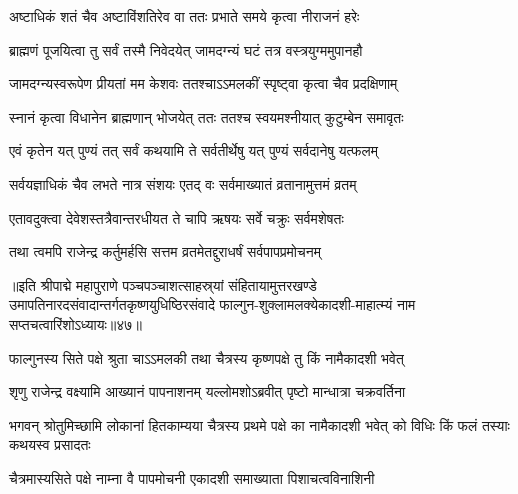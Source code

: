 \twolineshloka
{अष्टाधिकं शतं चैव अष्टाविंशतिरेव वा}
{ततः प्रभाते समये कृत्वा नीराजनं हरेः}%

\twolineshloka
{ब्राह्मणं पूजयित्वा तु सर्वं तस्मै निवेदयेत्}
{जामदग्न्यं घटं तत्र वस्त्रयुग्ममुपानहौ}%

\twolineshloka
{जामदग्न्यस्वरूपेण प्रीयतां मम केशवः}
{ततश्चाऽऽमलकीं स्पृष्ट्वा कृत्वा चैव प्रदक्षिणाम्}%

\twolineshloka
{स्नानं कृत्वा विधानेन ब्राह्मणान् भोजयेत् ततः}
{ततश्च स्वयमश्नीयात् कुटुम्बेन समावृतः}%

\twolineshloka
{एवं कृतेन यत् पुण्यं तत् सर्वं कथयामि ते}
{सर्वतीर्थेषु यत् पुण्यं सर्वदानेषु यत्फलम्}%

\twolineshloka
{सर्वयज्ञाधिकं चैव लभते नात्र संशयः}
{एतद् वः सर्वमाख्यातं व्रतानामुत्तमं व्रतम्}%

\twolineshloka
{एतावदुक्त्वा देवेशस्तत्रैवान्तरधीयत}
{ते चापि ऋषयः सर्वे चक्रुः सर्वमशेषतः}%

\twolineshloka
{तथा त्वमपि राजेन्द्र कर्तुमर्हसि सत्तम}
{व्रतमेतद्दुराधर्षं सर्वपापप्रमोचनम्}%

॥इति श्रीपाद्मे महापुराणे पञ्चपञ्चाशत्साहस्र्यां संहितायामुत्तरखण्डे उमापतिनारदसंवादान्तर्गतकृष्णयुधिष्ठिरसंवादे फाल्गुन-शुक्लामलक्येकादशी-माहात्म्यं नाम सप्तचत्वारिंशोऽध्यायः॥४७॥

\genMangalaShloka

\hyperref[sec:ekadashi_mahatmyam_padma_puranam]{\closesub}
\clearpage

\label{sec:padma-chaitra-krishna-papamochani}

\ganapatyadiDhyanam
\padmaPuranam



\twolineshloka
{फाल्गुनस्य सिते पक्षे श्रुता चाऽऽमलकी तथा}
{चैत्रस्य कृष्णपक्षे तु किं नामैकादशी भवेत्}%


\twolineshloka
{शृणु राजेन्द्र वक्ष्यामि आख्यानं पापनाशनम्}
{यल्लोमशोऽब्रवीत् पृष्टो मान्धात्रा चक्रवर्तिना}%


\threelineshloka
{भगवन् श्रोतुमिच्छामि लोकानां हितकाम्यया}
{चैत्रस्य प्रथमे पक्षे का नामैकादशी भवेत्}
{को विधिः किं फलं तस्याः कथयस्व प्रसादतः}%


\twolineshloka
{चैत्रमास्यसिते पक्षे नाम्ना वै पापमोचनी}
{एकादशी समाख्याता पिशाचत्वविनाशिनी}%

